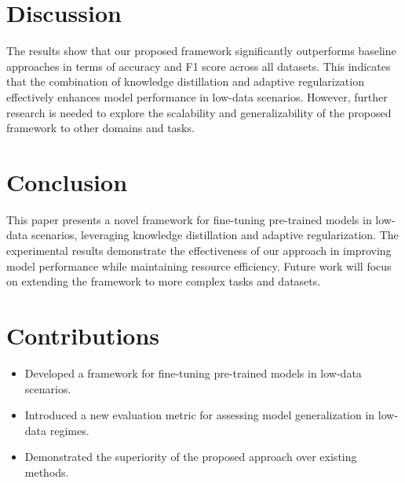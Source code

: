 \documentclass{article}
\begin{document}
\section{Discussion}
\label{sec:discussion}
The results show that our proposed framework significantly outperforms baseline approaches in terms of accuracy and F1 score across all datasets. This indicates that the combination of knowledge distillation and adaptive regularization effectively enhances model performance in low-data scenarios. However, further research is needed to explore the scalability and generalizability of the proposed framework to other domains and tasks.

\section{Conclusion}
\label{sec:conclusion}
This paper presents a novel framework for fine-tuning pre-trained models in low-data scenarios, leveraging knowledge distillation and adaptive regularization. The experimental results demonstrate the effectiveness of our approach in improving model performance while maintaining resource efficiency. Future work will focus on extending the framework to more complex tasks and datasets.

\section{Contributions}
\label{sec:contributions}
\begin{itemize}
    \item Developed a framework for fine-tuning pre-trained models in low-data scenarios.
    \item Introduced a new evaluation metric for assessing model generalization in low-data regimes.
    \item Demonstrated the superiority of the proposed approach over existing methods.
\end{itemize}
\end{document}
